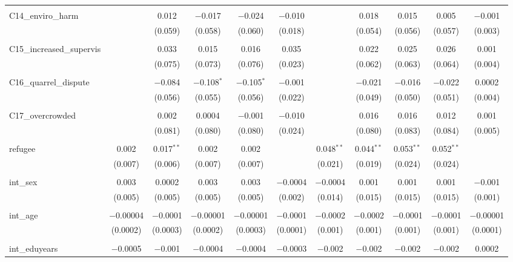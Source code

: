 \begin{table}[H]
\begin{tabular}{@{\extracolsep{4pt}}lcccccccccc}
  & & & & & & & & & & \\ 
 C14\_enviro\_harm &  & 0.012 & $-$0.017 & $-$0.024 & $-$0.010 &  & 0.018 & 0.015 & 0.005 & $-$0.001 \\ 
  &  & (0.059) & (0.058) & (0.060) & (0.018) &  & (0.054) & (0.056) & (0.057) & (0.003) \\ 
  & & & & & & & & & & \\ 
 C15\_increased\_supervis &  & 0.033 & 0.015 & 0.016 & 0.035 &  & 0.022 & 0.025 & 0.026 & 0.001 \\ 
  &  & (0.075) & (0.073) & (0.076) & (0.023) &  & (0.062) & (0.063) & (0.064) & (0.004) \\ 
  & & & & & & & & & & \\ 
 C16\_quarrel\_dispute &  & $-$0.084 & $-$0.108$^{*}$ & $-$0.105$^{*}$ & $-$0.001 &  & $-$0.021 & $-$0.016 & $-$0.022 & 0.0002 \\ 
  &  & (0.056) & (0.055) & (0.056) & (0.022) &  & (0.049) & (0.050) & (0.051) & (0.004) \\ 
  & & & & & & & & & & \\ 
 C17\_overcrowded &  & 0.002 & 0.0004 & $-$0.001 & $-$0.010 &  & 0.016 & 0.016 & 0.012 & 0.001 \\ 
  &  & (0.081) & (0.080) & (0.080) & (0.024) &  & (0.080) & (0.083) & (0.084) & (0.005) \\ 
  & & & & & & & & & & \\ 
 refugee & 0.002 & 0.017$^{**}$ & 0.002 & 0.002 &  & 0.048$^{**}$ & 0.044$^{**}$ & 0.053$^{**}$ & 0.052$^{**}$ &  \\ 
  & (0.007) & (0.006) & (0.007) & (0.007) &  & (0.021) & (0.019) & (0.024) & (0.024) &  \\ 
  & & & & & & & & & & \\ 
 int\_sex & 0.003 & 0.0002 & 0.003 & 0.003 & $-$0.0004 & $-$0.0004 & 0.001 & 0.001 & 0.001 & $-$0.001 \\ 
  & (0.005) & (0.005) & (0.005) & (0.005) & (0.002) & (0.014) & (0.015) & (0.015) & (0.015) & (0.001) \\ 
  & & & & & & & & & & \\ 
 int\_age & $-$0.00004 & $-$0.0001 & $-$0.00001 & $-$0.00001 & $-$0.0001 & $-$0.0002 & $-$0.0002 & $-$0.0001 & $-$0.0001 & $-$0.00001 \\ 
  & (0.0002) & (0.0003) & (0.0002) & (0.0003) & (0.0001) & (0.001) & (0.001) & (0.001) & (0.001) & (0.0001) \\ 
  & & & & & & & & & & \\ 
 int\_eduyears & $-$0.0005 & $-$0.001 & $-$0.0004 & $-$0.0004 & $-$0.0003 & $-$0.002 & $-$0.002 & $-$0.002 & $-$0.002 & 0.0002 \\ 

\end{tabular}
\end{table}
